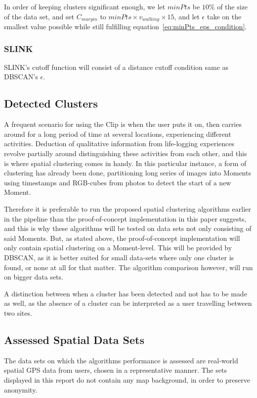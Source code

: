In order of keeping clusters significant enough, we let $minPts$ be
$10\%$ of the size of the data set, and set $C_{margin}$ to 
$minPts \times v_{walking} \times 15$, and let $\epsilon$ take
on the smallest value possible while still fulfilling 
equation~\ref{eq:minPts_eps_condition}.

\subsubsection{SLINK}
SLINK's cutoff function will consist of a distance cutoff condition same as 
DBSCAN's $ \epsilon $. 

\subsection{Detected Clusters}
A frequent scenario for using the Clip is when the user puts it on, then 
carries around for a long period of time at several locations, experiencing 
different activities. Deduction of qualitative information from life-logging 
experiences revolve partially around distinguishing these activities from 
each other, and this is where spatial clustering comes in handy. In this 
particular instance, a form of clustering has already been done, partitioning
long series of images into Moments using timestamps and RGB-cubes from photos
to detect the start of a new Moment. 

Therefore it is preferable to run the proposed spatial clustering algorithms
earlier in the pipeline than the proof-of-concept implementation in this paper
suggests, and this is why these algorithms will be tested on data sets not
only consisting of said Moments. But, as stated above, the proof-of-concept
implementation will only contain spatial clustering on a Moment-level. This 
will be provided by DBSCAN, as it is better suited for small data-sets where
only one cluster is found, or none at all for that matter. The algorithm
comparison however, will run on bigger data sets. 

A distinction between when a cluster has been detected and not has to be made 
as well, as the absence of a cluster can be interpreted as a user travelling 
between two sites.

\subsection{Assessed Spatial Data Sets}
The data sets on which the algorithms performance is assessed are real-world
spatial GPS data from users, chosen in a representative manner. The sets 
displayed in this report do not contain any map background, in order to
preserve anonymity.

